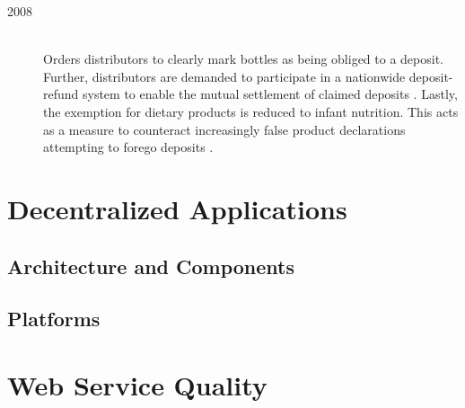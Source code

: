 \begin{description}
	\item[2008]
	\hfill \\
	Orders distributors to clearly mark bottles as being obliged to a deposit. Further, distributors are demanded to participate in a nationwide deposit-refund system to enable the mutual settlement of claimed deposits \cite[§~9]{verpackV2008}. Lastly, the exemption for dietary products is reduced to infant nutrition. This acts as a measure to counteract increasingly false product declarations attempting to forego deposits \cite[pp. 531]{BGBl. 2008} \cite[p.~171]{Flanderka/Stroetmann 2009}.
\end{description}


\section{Decentralized Applications}

\subsection{Architecture and Components}
\subsection{Platforms}

\section{Web Service Quality}
